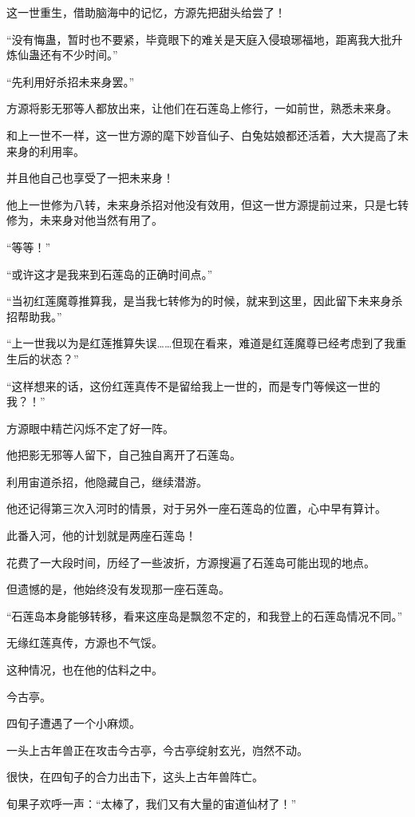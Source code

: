 \begin{this_body}
这一世重生，借助脑海中的记忆，方源先把甜头给尝了！

“没有悔蛊，暂时也不要紧，毕竟眼下的难关是天庭入侵琅琊福地，距离我大批升炼仙蛊还有不少时间。”

“先利用好杀招未来身罢。”

方源将影无邪等人都放出来，让他们在石莲岛上修行，一如前世，熟悉未来身。

和上一世不一样，这一世方源的麾下妙音仙子、白兔姑娘都还活着，大大提高了未来身的利用率。

并且他自己也享受了一把未来身！

他上一世修为八转，未来身杀招对他没有效用，但这一世方源提前过来，只是七转修为，未来身对他当然有用了。

“等等！”

“或许这才是我来到石莲岛的正确时间点。”

“当初红莲魔尊推算我，是当我七转修为的时候，就来到这里，因此留下未来身杀招帮助我。”

“上一世我以为是红莲推算失误……但现在看来，难道是红莲魔尊已经考虑到了我重生后的状态？”

“这样想来的话，这份红莲真传不是留给我上一世的，而是专门等候这一世的我？！”

方源眼中精芒闪烁不定了好一阵。

他把影无邪等人留下，自己独自离开了石莲岛。

利用宙道杀招，他隐藏自己，继续潜游。

他还记得第三次入河时的情景，对于另外一座石莲岛的位置，心中早有算计。

此番入河，他的计划就是两座石莲岛！

花费了一大段时间，历经了一些波折，方源搜遍了石莲岛可能出现的地点。

但遗憾的是，他始终没有发现那一座石莲岛。

“石莲岛本身能够转移，看来这座岛是飘忽不定的，和我登上的石莲岛情况不同。”

无缘红莲真传，方源也不气馁。

这种情况，也在他的估料之中。

今古亭。

四旬子遭遇了一个小麻烦。

一头上古年兽正在攻击今古亭，今古亭绽射玄光，岿然不动。

很快，在四旬子的合力出击下，这头上古年兽阵亡。

旬果子欢呼一声：“太棒了，我们又有大量的宙道仙材了！”


\end{this_body}
